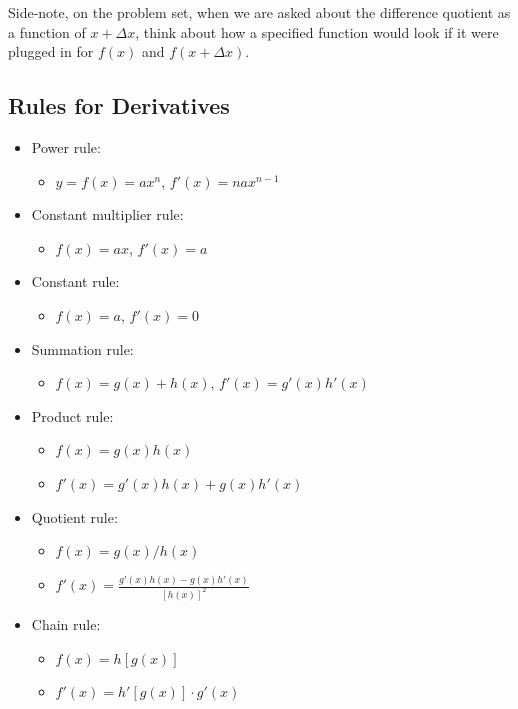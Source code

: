 \noindent Side-note, on the problem set, when we are asked about the difference quotient as a function of $x + \Delta x$, think about how a specified function would look if it were plugged in for $f(x)$ and $f(x + \Delta x)$.

\subsection{Rules for Derivatives}

\begin{itemize}
    \itemsep-0.5em 
    \item Power rule:
    \begin{itemize}
        \item $y = f(x) = ax^n$, $f'(x) = nax^{n-1}$
    \end{itemize}
    \item Constant multiplier rule:
    \begin{itemize}
        \item $f(x) = ax$, $f'(x) = a$
    \end{itemize}
    \item Constant rule:
    \begin{itemize}
        \item $f(x) = a$, $f'(x) = 0$
    \end{itemize}
    \item Summation rule:
    \begin{itemize}
        \item $f(x) = g(x) + h(x)$, $f'(x) = g'(x)h'(x)$
    \end{itemize}
    \item Product rule:
    \begin{itemize}
        \item $f(x) = g(x)h(x)$
        \item $f'(x) = g'(x)h(x) + g(x)h'(x)$
    \end{itemize}
    \item Quotient rule:
    \begin{itemize}
        \item $f(x) = g(x)/h(x)$
        \item $f'(x) = \frac{g'(x)h(x) - g(x)h'(x)}{[h(x)]^2}$
    \end{itemize} 
    \item Chain rule:
    \begin{itemize}
        \item $f(x) = h[g(x)]$
        \item $f'(x) = h'[g(x)] \cdot g'(x)$

\end{itemize}
\end{itemize}
